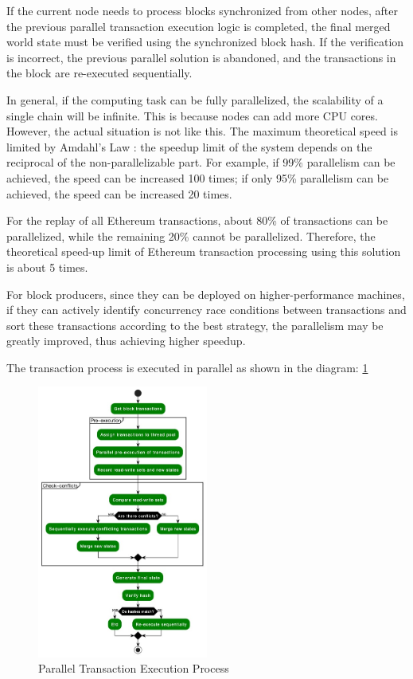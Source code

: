 If the current node needs to process blocks synchronized from other nodes, after the previous parallel transaction execution logic is completed, the final merged world state must be verified using the synchronized block hash. If the verification is incorrect, the previous parallel solution is abandoned, and the transactions in the block are re-executed sequentially.

In general, if the computing task can be fully parallelized, the scalability of a single chain will be infinite. This is because nodes can add more CPU cores. However, the actual situation is not like this. The maximum theoretical speed is limited by Amdahl's Law \cite{website:Amdahls-law}: the speedup limit of the system depends on the reciprocal of the non-parallelizable part. For example, if 99\% parallelism can be achieved, the speed can be increased 100 times; if only 95\% parallelism can be achieved, the speed can be increased 20 times.

For the replay of all Ethereum transactions, about 80\% of transactions can be parallelized, while the remaining 20\% cannot be parallelized. Therefore, the theoretical speed-up limit of Ethereum transaction processing using this solution is about 5 times.

For block producers, since they can be deployed on higher-performance machines, if they can actively identify concurrency race conditions between transactions and sort these transactions according to the best strategy, the parallelism may be greatly improved, thus achieving higher speedup.

The transaction process is executed in parallel as shown in the diagram: \ref{fig:paralle-execution}

\begin{figure}[!ht]
    \centering
    \includegraphics[width=0.5\textwidth]{images/paralle-execution.jpg}
    \caption{Parallel Transaction Execution Process}
    \label{fig:paralle-execution}
\end{figure}

